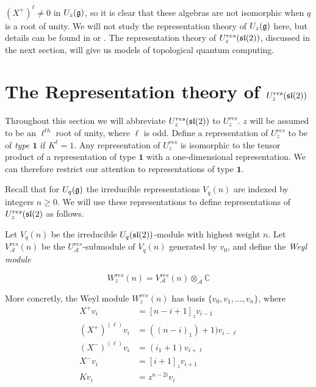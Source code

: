 $(X^+)^\ell \neq 0$ in $U_z(\mathfrak{g})$, so it is clear that these algebras
are not isomorphic when $q$ is a root of unity. We will not study the
representation theory of $U_z(\mathfrak{g})$ here, but details can be found in
\cite{Kassel1994} or \cite{Jantzen1995}. The representation theory of
$U_z^{res}(\mathfrak{sl}(2))$, discussed in the next section, will give us models
of topological quantum computing. 

\section{The Representation theory of $U_z^{res}(\mathfrak{sl}(2))$}
\label{RepTheoryofResSL2}

Throughout this section we will abbreviate $U_z^{res}(\mathfrak{sl}(2))$ to $U_z^{res}$.
$z$ will be assumed to be an $\ell^{th}$ root of unity, where $\ell$ is odd.
Define a representation of $U_z^{res}$ to be of \emph{type $\mathbf{1}$} if
$K^\ell = 1$. Any representation of $U_z^{res}$ is isomorphic to the tensor
product of a representation of type $\mathbf{1}$ with a one-dimensional
representation. We can therefore restrict our attention to representations of
type $\mathbf{1}$. 

Recall that for $U_q(\mathfrak{g})$ the irreducible representations $V_q(n)$ are
indexed by integers $n \geq 0$. We will use these representations to define
representations of $U_z^{res}(\mathfrak{sl}(2)$ as follows.

Let $V_q(n)$ be the irreducible $U_q(\mathfrak{sl}(2))$-module with highest weight $n$.
Let $V_\mathcal{A}^{res}(n)$ be the $U_\mathcal{A}^{res}$-submodule of $V_q(n)$
generated by $v_0$, and define the \emph{Weyl module}

\begin{equation}
    W_z^{res}(n) = V_\mathcal{A}^{res}(n) \otimes_\mathcal{A} \mathbb{C}
\end{equation}


More concretly, the Weyl module $W_z^{res}(n)$ has basis $\{v_0, v_1, \ldots, v_n\}$, where
\begin{align}
    X^+ v_i &= [n-i+1]_z v_{i-1} \\
    (X^+)^{(\ell)} v_i &= ( (n-i)_1) + 1) v_{i-\ell} \\
    (X^-)^{(\ell)} v_i &= ( i_1 + 1) v_{i+\ell} \\
    X^-v_i &= [i+1]_z v_{i+1} \\
    Kv_i &= z^{n-2i} v_i \\
\end{align}

